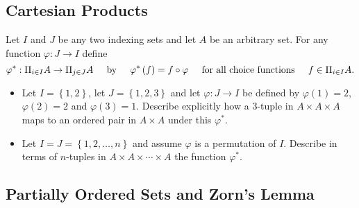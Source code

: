 \documentclass[12pt]{article}
\newenvironment{problem}[2][Exercise]{\begin{trivlist}
\item[\hskip \labelsep {\bfseries #1}\hskip \labelsep {\bfseries #2.}]}{\end{trivlist}}
\begin{document}
\subsection*{Cartesian Products}
\begin{problem}{I.1.1}
Let $I$ and $J$ be any two indexing sets and let $A$ be an arbitrary set. For any function $\varphi:J\rightarrow I$ define \[ \varphi ^*: \Pi_{i\in I} A \rightarrow \Pi_{j\in J} A \hspace{5mm} \text{by} \hspace{5mm} \varphi^*\left(f\right)=f\circ \varphi \hspace{5mm} \text{for all choice functions} \hspace{5mm} f\in \Pi_{i\in I} A. \]
\begin{itemize}
	\item Let $I=\left\{1,2\right\}$, let $J=\left\{1,2,3\right\}$ and let $\varphi:J\rightarrow I$ be defined by $\varphi \left(1\right)=2$, $\varphi\left(2\right)=2$ and $\varphi\left(3\right)=1$. Describe explicitly how a 3-tuple in $A\times A\times A$ maps to an ordered pair in $A \times A$ under this $\varphi^*$.
	\item Let $I=J=\left\{1,2,\ldots , n\right\}$ and assume $\varphi$ is a permutation of $I$. Describe in terms of $n$-tuples in $A\times A\times \cdots \times A$ the function $\varphi^*$.
\end{itemize}
\end{problem}


\subsection*{Partially Ordered Sets and Zorn's Lemma}
\end{document}

